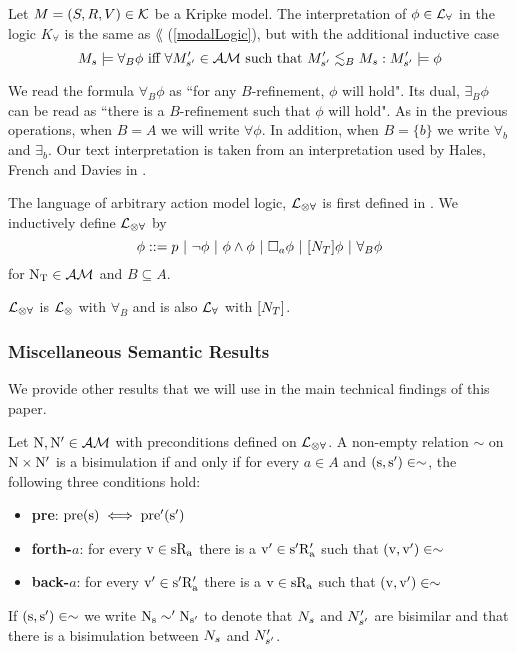 \begin{defn} \label{refineLogic}
Let $M = (S, R, V) \in \mathcal{K}$ be a Kripke model.
The interpretation of $\phi \in \mathcal{L}_{\forall}$ in the logic $K_\forall$ is the same as $\lang$
(\ref{modalLogic}), but with the additional inductive case
\[
	M_s \models \forall_B \phi \text{ iff } \forall M'_{s'} \in
  \mathcal{AM} \text{ such that } M'_{s'}
	\lesssim_B M_s : M'_{s'} \models \phi
\]
\end{defn}
We read the formula $\forall_B \phi$ as ``for any $B$-refinement, $\phi$ will hold".
Its dual, $\exists_B \phi$ can be read as ``there is a $B$-refinement such that $\phi$ will hold".
As in the previous operations, when $B = A$ we will write $\forall \phi$.
In addition, when $B = \{b\}$ we write $\forall_b$ and $\exists_b$.
Our text interpretation is taken from an interpretation used by Hales, French and Davies in \cite{hales2012refinement}.

\begin{defn} \label{arbActLogic}
The language of arbitrary action model logic, $\mathcal{L}_{\otimes\forall}$ is first defined in \cite{hales13synthesis}.
We inductively define $\mathcal{L}_{\otimes\forall}$ by
\[
	\phi ::= p \text{ } | \text{ } \neg \phi \text{ } | \text{ } \phi \land \phi \text{ } | \text{ } \Box_a \phi \text{ } |
  \text{ }[{N_T}] \phi \text{ } | \text{ } \forall_B \phi
\]
for $ \mathrm{N_T}  \in \mathcal{AM}$ and $B \subseteq A$.
\end{defn}
$\mathcal{L}_{\otimes\forall}$ is $\mathcal{L}_{\otimes}$ with $\forall_B$ and is also $\mathcal{L}_{\forall}$ with $[{N_T}]$.


\subsubsection{Miscellaneous Semantic Results}
We provide other results that we will use in the main technical findings of this paper.

\begin{defn} \label{bisimEvent}
	Let $ \mathrm{N, N'}  \in \mathcal{AM}$ with preconditions defined on $\mathcal{L}_{\otimes\forall}$.
	A non-empty relation $\sim$ on $ \mathrm{N}  \times  \mathrm{N'} $ is a bisimulation if and only if for every $a \in A$
	and $ \mathrm{(s, s') \in \sim} $, the following three conditions hold:
	\begin{itemize}
		\item {\bf pre}: $ \mathrm{pre(s)}  \iff  \mathrm{pre'(s')} $
		\item {\bf forth-$a$}: for every $ \mathrm{v \in s R_a} $ there is a $ \mathrm{v'
      \in s' R'_a} $ such that $ \mathrm{(v,v')}  \in \sim$
		\item {\bf back-$a$}: for every $ \mathrm{v' \in s' R'_a} $ there is a $ \mathrm{v
      \in s R_a} $ such that $ \mathrm{(v,v')}  \in
		\sim$
	\end{itemize}
	If $ \mathrm{(s, s') \in \sim} $ we write $ \mathrm{N_s \sim 'N_{s'}} $ to
  denote that $N_s$ and $N'_{s'}$ are bisimilar and
	that there is a bisimulation between $N_s$ and $N'_{s'}$.
\end{defn}

